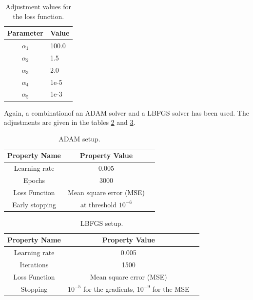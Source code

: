 \documentclass[a4paper,11pt]{article}
\begin{document}
\begin{table}[h!]
\centering
\begin{tabular}{cl}
\toprule
\textbf{Parameter} & \textbf{Value}\\
\midrule
$ \alpha_1 $ & 100.0 \\
$ \alpha_2 $ & 1.5 \\
$ \alpha_3 $ & 2.0 \\
$ \alpha_4 $ & 1e-5 \\
$ \alpha_5 $ & 1e-3 \\
\bottomrule
\end{tabular}
\caption{Adjustment values for the loss function.}
\label{LossFunctionAdjustment}
\end{table}

Again, a combinationof an ADAM solver and a LBFGS solver has been used. The adjustments are given in the tables \ref{AdamSetup2} and \ref{LBFGSSetup2}.

\begin{table}[htbp]
\centering
\begin{tabular}{ccl}
\toprule
\textbf{Property Name} & \textbf{Property Value}\\
\midrule
Learning rate & 0.005\\
Epochs & 3000 \\
Loss Function & Mean square error (MSE) \\
Early stopping & at threshold $10^{-6} $ \\
\bottomrule
\end{tabular}
\caption{ADAM setup.}
\label{AdamSetup2}
\end{table}

\begin{table}[h!]
\centering
\begin{tabular}{ccl}
\toprule
\textbf{Property Name} & \textbf{Property Value}\\
\midrule
Learning rate & 0.005\\
Iterations & 1500 \\
Loss Function & Mean square error (MSE) \\
Stopping & $10^{-5} $ for the gradients, $10^{-9} $ for the MSE\\
\bottomrule
\end{tabular}
\caption{LBFGS setup.}
\label{LBFGSSetup2}
\end{table}
\end{document}
